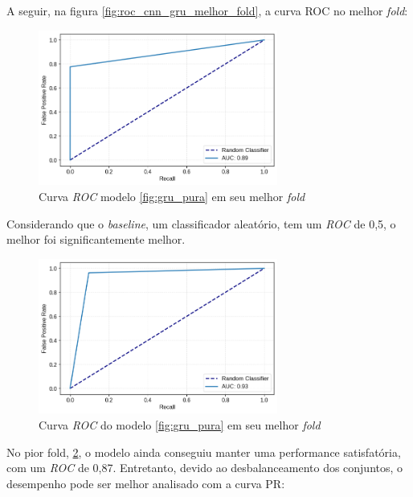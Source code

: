 \documentclass[
    12pt,                %
    openright,           %
    oneside,             %
    a4paper,             %
    brazil               %
]{abntex2}
\begin{document}
A seguir, na figura \ref{fig:roc_cnn_gru_melhor_fold}, a curva ROC no melhor \textit{fold}:

\begin{figure}[H]
  \centering
   \includegraphics[width=0.7\textwidth]{figuras/modelos_resultados/gru/roc_gru_melhor_fold.png} %
  \caption{Curva \textit{ROC} modelo \ref{fig:gru_pura} em seu melhor \textit{fold}}
  \label{fig:roc_melhor_fold_gru}
\end{figure}

Considerando que o \textit{baseline}, um classificador aleatório, tem um \textit{ROC} de 0,5, o melhor foi significantemente melhor.

\begin{figure}[H]
  \centering
   \includegraphics[width=0.7\textwidth]{figuras/modelos_resultados/gru/roc_gru_pior_fold.png} %
  \caption{Curva \textit{ROC} do modelo \ref{fig:gru_pura} em seu melhor \textit{fold}}
  \label{fig:roc_pior_fold_gru}
\end{figure}

No pior fold, \ref{fig:roc_pior_fold_gru}, o modelo ainda conseguiu manter uma performance satisfatória, com um \textit{ROC} de 0,87. 
Entretanto, devido ao desbalanceamento dos conjuntos, o desempenho pode ser melhor analisado com a curva PR:
\end{document}
